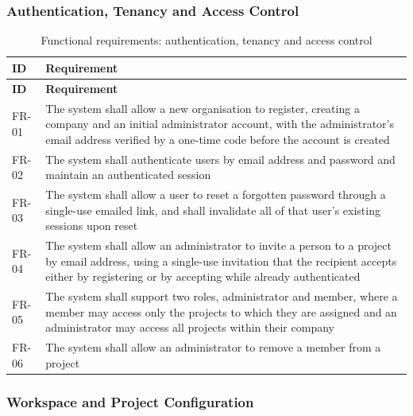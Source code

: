 \subsubsection{Authentication, Tenancy and Access Control}

\begin{longtable}{
  >{\raggedright\arraybackslash}p{}
  >{\raggedright\arraybackslash}p{}
}
\caption{Functional requirements: authentication, tenancy and access control}
\label{tab:fr-auth}\\
\toprule
\textbf{ID} & \textbf{Requirement} \\
\midrule
\endfirsthead
\toprule
\textbf{ID} & \textbf{Requirement} \\
\midrule
\endhead
\bottomrule
\endlastfoot
FR-01 & The system shall allow a new organisation to register, creating a company and
an initial administrator account, with the administrator's email address verified by
a one-time code before the account is created \\
\addlinespace
FR-02 & The system shall authenticate users by email address and password and
maintain an authenticated session \\
\addlinespace
FR-03 & The system shall allow a user to reset a forgotten password through a
single-use emailed link, and shall invalidate all of that user's existing sessions
upon reset \\
\addlinespace
FR-04 & The system shall allow an administrator to invite a person to a project by
email address, using a single-use invitation that the recipient accepts either by
registering or by accepting while already authenticated \\
\addlinespace
FR-05 & The system shall support two roles, administrator and member, where a member
may access only the projects to which they are assigned and an administrator may
access all projects within their company \\
\addlinespace
FR-06 & The system shall allow an administrator to remove a member from a project \\
\end{longtable}

\subsubsection{Workspace and Project Configuration}

